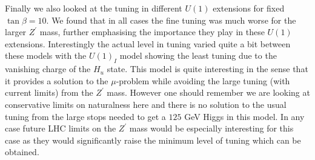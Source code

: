 \documentclass[preprint,amsmath,amssymb,aps,superscriptaddress,prd,showpacs,floatfix,nofootinbib]{revtex4-1}
\begin{document}
Finally we also looked at the tuning in different $U(1)$ extensions for
fixed $\tan \beta = 10$.  We found that in all cases the fine tuning
was much worse for the larger $Z^\prime$ mass, further emphasising
the importance they play in these $U(1)$ extensions.  Interestingly
the actual level in tuning varied quite a bit between these models
with the $U(1)_I$ model showing the least tuning due to the vanishing
charge of the $H_u$ state. This model is quite interesting in the
sense that it provides a solution to the $\mu$-problem while avoiding
the large tuning (with current limits) from the $Z^\prime$
mass. However one should remember we are looking at conservative limits
on naturalness here and there is no solution to the usual tuning from
the large stops needed to get a $125$ GeV Higgs in this model.  In any
case future LHC limits on the $Z^\prime$ mass would be especially
interesting for this case as they would significantly raise the
minimum level of tuning which can be obtained.


 
\appendix
\end{document}
